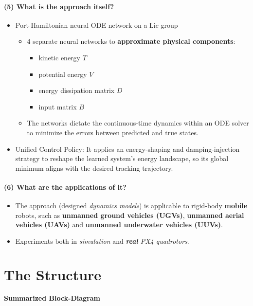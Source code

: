 \documentclass{article}
\begin{document}
\paragraph{(5) What is the approach itself?}
\begin{itemize}
  \item Port-Hamiltonian neural ODE network on a Lie group
  \begin{itemize}
    \item 4 separate neural networks to \textbf{approximate physical components}:
    \begin{itemize}
      \item kinetic energy $T$
      \item potential energy $V$
      \item energy dissipation matrix $D$
      \item input matrix $B$
    \end{itemize}
    \item The networks dictate the continuous-time dynamics within an ODE solver to minimize the errors between predicted and true states.
  \end{itemize}
  \item Unified Control Policy: It applies an energy-shaping and damping-injection strategy to reshape the learned system's energy landscape, so its global minimum aligns with the desired tracking trajectory.
\end{itemize}

\paragraph{(6) What are the applications of it?} 
\begin{itemize}
  \item The approach (designed \textit{dynamics models}) is applicable to rigid-body \textbf{mobile} robots, such as \textbf{unmanned ground vehicles (UGVs)}, \textbf{unmanned aerial vehicles (UAVs)} and \textbf{unmanned underwater vehicles (UUVs)}.
  \item Experiments both in \textit{simulation} and \textit{\textbf{real} PX4 quadrotors}.
\end{itemize}

\section{The Structure}

\paragraph{Summarized Block-Diagram} 
\end{document}
